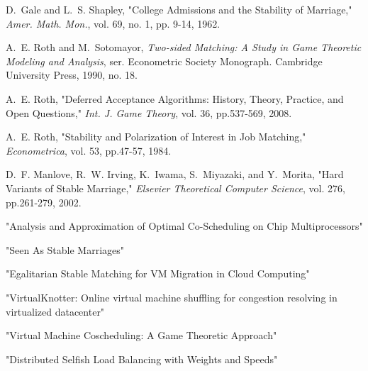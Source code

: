 \documentclass[conference]{IEEEtran}
\begin{document}

%
%
%
\begin{thebibliography}{1}

D.~Gale and L.~S. Shapley, "College Admissions and the Stability
of Marriage," \emph{Amer. Math. Mon.}, vol. 69, no. 1, pp. 9-14, 1962.

A.~E. Roth and M.~Sotomayor, \emph{Two-sided Matching: A Study in
Game Theoretic Modeling and Analysis}, ser. Econometric Society
Monograph.  Cambridge University Press, 1990, no. 18.

A.~E. Roth, "Deferred Acceptance Algorithms: History, Theory,
Practice, and Open Questions," \emph{Int. J. Game Theory},
vol. 36, pp.537-569, 2008.

A.~E. Roth, "Stability and Polarization of Interest in Job
Matching," \emph{Econometrica}, vol. 53, pp.47-57, 1984.

D.~F. Manlove, R.~W. Irving, K.~Iwama, S.~Miyazaki, and Y.~Morita,
 "Hard Variants of Stable Marriage," \emph{Elsevier Theoretical Computer Science},
vol. 276, pp.261-279, 2002.

"Analysis and Approximation of Optimal Co-Scheduling on Chip Multiprocessors"

"Seen As Stable Marriages"

"Egalitarian Stable Matching for VM Migration in Cloud Computing"

"VirtualKnotter:  Online virtual machine shuffling for congestion resolving in
virtualized datacenter"


"Virtual Machine Coscheduling: A Game Theoretic Approach"

"Distributed Selfish Load Balancing with Weights and Speeds"


\end{thebibliography}




\end{document}
